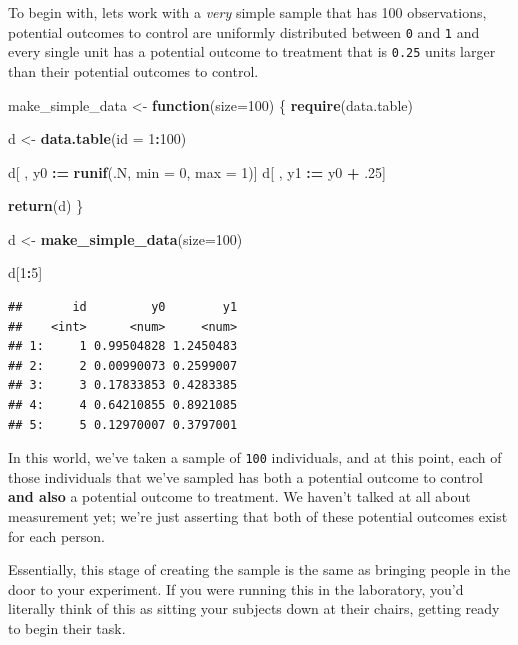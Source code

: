 \documentclass[
]{article}
\newenvironment{Shaded}{\begin{snugshade}}{\end{snugshade}}
\newcommand{\AttributeTok}[1]{\textcolor[rgb]{0.13,0.29,0.53}{#1}}
\newcommand{\ControlFlowTok}[1]{\textcolor[rgb]{0.13,0.29,0.53}{\textbf{#1}}}
\newcommand{\DecValTok}[1]{\textcolor[rgb]{0.00,0.00,0.81}{#1}}
\newcommand{\FunctionTok}[1]{\textcolor[rgb]{0.13,0.29,0.53}{\textbf{#1}}}
\newcommand{\NormalTok}[1]{#1}
\newcommand{\OtherTok}[1]{\textcolor[rgb]{0.56,0.35,0.01}{#1}}
\newcommand{\SpecialCharTok}[1]{\textcolor[rgb]{0.81,0.36,0.00}{\textbf{#1}}}
\theoremstyle{definition}
\theoremstyle{definition}
\theoremstyle{definition}
\theoremstyle{definition}
\theoremstyle{remark}
\begin{document}
To begin with, lets work with a \emph{very} simple sample that has 100 observations, potential outcomes to control are uniformly distributed between \texttt{0} and \texttt{1} and every single unit has a potential outcome to treatment that is \texttt{0.25} units larger than their potential outcomes to control.

\begin{Shaded}
\begin{Highlighting}[]
\NormalTok{make\_simple\_data }\OtherTok{\textless{}{-}} \ControlFlowTok{function}\NormalTok{(}\AttributeTok{size=}\DecValTok{100}\NormalTok{) \{ }
  \FunctionTok{require}\NormalTok{(data.table) }
  
\NormalTok{  d }\OtherTok{\textless{}{-}} \FunctionTok{data.table}\NormalTok{(}\AttributeTok{id =} \DecValTok{1}\SpecialCharTok{:}\DecValTok{100}\NormalTok{)  }
  
\NormalTok{  d[ , y0 }\SpecialCharTok{:=} \FunctionTok{runif}\NormalTok{(.N, }\AttributeTok{min =} \DecValTok{0}\NormalTok{, }\AttributeTok{max =} \DecValTok{1}\NormalTok{)]}
\NormalTok{  d[ , y1 }\SpecialCharTok{:=}\NormalTok{ y0 }\SpecialCharTok{+}\NormalTok{ .}\DecValTok{25}\NormalTok{]}
  
  \FunctionTok{return}\NormalTok{(d)}
\NormalTok{  \}}

\NormalTok{d }\OtherTok{\textless{}{-}} \FunctionTok{make\_simple\_data}\NormalTok{(}\AttributeTok{size=}\DecValTok{100}\NormalTok{)}

\NormalTok{d[}\DecValTok{1}\SpecialCharTok{:}\DecValTok{5}\NormalTok{]}
\end{Highlighting}
\end{Shaded}

\begin{verbatim}
##       id         y0        y1
##    <int>      <num>     <num>
## 1:     1 0.99504828 1.2450483
## 2:     2 0.00990073 0.2599007
## 3:     3 0.17833853 0.4283385
## 4:     4 0.64210855 0.8921085
## 5:     5 0.12970007 0.3797001
\end{verbatim}

In this world, we've taken a sample of \texttt{100} individuals, and at this point, each of those individuals that we've sampled has both a potential outcome to control \textbf{and also} a potential outcome to treatment. We haven't talked at all about measurement yet; we're just asserting that both of these potential outcomes exist for each person.

Essentially, this stage of creating the sample is the same as bringing people in the door to your experiment. If you were running this in the laboratory, you'd literally think of this as sitting your subjects down at their chairs, getting ready to begin their task.
\end{document}
